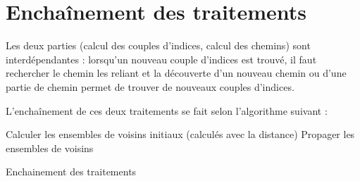 \section{Enchaînement des traitements}

Les deux parties (calcul des couples d'indices, calcul des chemins) sont
interdépendantes : lorsqu'un nouveau couple d'indices est trouvé, il
faut rechercher le chemin les reliant et la découverte d'un nouveau
chemin ou d'une partie de chemin permet de trouver de nouveaux couples
d'indices.

L'enchaînement de ces deux traitements se fait selon l'algorithme suivant :
\begin{algorithm}
Calculer les ensembles de voisins initiaux (calculés avec la distance) \;
Propager les ensembles de voisins \;
\caption{Enchainement des traitements}
\end{algorithm}
